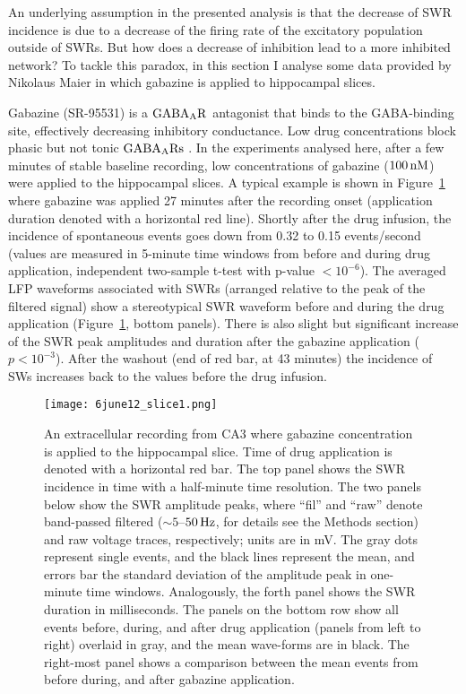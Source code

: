     An underlying assumption in the presented analysis is that the decrease of
    SWR incidence is due to a decrease of the firing rate of the excitatory
    population outside of SWRs. But how does a decrease of inhibition lead to a
    more inhibited network? To tackle this paradox, in this section I analyse
    some data provided by Nikolaus Maier in which gabazine is applied to
    hippocampal slices.
    
    Gabazine (SR-95531) is a $\rm GABA_AR$ antagonist that binds to the
    GABA-binding site, effectively decreasing inhibitory conductance. Low drug
    concentrations block phasic but not tonic $\rm GABA_ARs$ \citep{Bai2001,
    Yeung2003, Behrens2007}. In the experiments analysed here, after a few
    minutes of stable baseline recording, low concentrations of gabazine ($100
    \,\rm nM$) were applied to the hippocampal slices. A typical example is
    shown in Figure~\ref{fig:gabazine_ex} where gabazine was applied 27 minutes
    after the recording onset (application duration denoted with a horizontal
    red line). Shortly after the drug infusion, the incidence of spontaneous
    events goes down from 0.32 to 0.15 events/second (values are measured in
    5-minute time windows from before and during drug application, independent
    two-sample t-test with p-value $<10^{-6}$). The averaged LFP waveforms
    associated with SWRs (arranged relative to the peak of the filtered signal)
    show a stereotypical SWR waveform before and during the drug application
    (Figure~\ref{fig:gabazine_ex}, bottom panels). There is also slight but
    significant increase of the SWR peak amplitudes and duration after the
    gabazine application ($p<10^{-3}$). After the washout (end of red bar, at
    43 minutes) the incidence of SWs increases back to the values before the
    drug infusion.
    
    \begin{figure}
      \center
      \texttt{[image: 6june12\_slice1.png]}
      \caption{
        An extracellular recording from CA3 where gabazine concentration is
        applied to the hippocampal slice. Time of drug application is denoted
        with a horizontal red bar. The top panel shows the SWR incidence in time
        with a half-minute time resolution. The two panels below show the SWR
        amplitude peaks, where ``fil'' and ``raw'' denote band-passed filtered
        ($\sim 5$--$50\, \rm Hz$, for details see the Methods section) and raw
        voltage traces, respectively; units are in mV. The gray dots represent
        single events, and the black lines represent the mean, and errors bar
        the standard deviation of the amplitude peak in one-minute time
        windows. Analogously, the forth panel shows the SWR duration in
        milliseconds. The panels on the bottom row show all events before,
        during, and after drug application (panels from left to right) overlaid
        in gray, and the mean wave-forms are in black. The right-most panel
        shows a comparison between the mean events from before during, and
        after gabazine application.
      }
      \label{fig:gabazine_ex}
    \end{figure}


